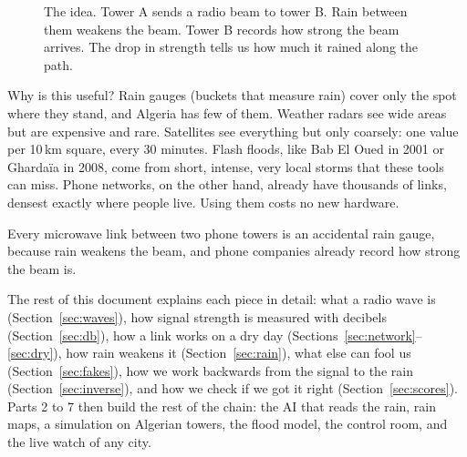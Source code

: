 \documentclass[11pt,a4paper]{article}
\begin{document}
\begin{figure}[h]
\centering
{}
\caption{The idea. Tower A sends a radio beam to tower B. Rain between them weakens the beam.
Tower B records how strong the beam arrives. The drop in strength tells us how much it rained
along the path.}
\label{fig:idea}
\end{figure}

Why is this useful? Rain gauges (buckets that measure rain) cover only the spot where they stand,
and Algeria has few of them. Weather radars see wide areas but are expensive and rare. Satellites
see everything but only coarsely: one value per 10\,km square, every 30 minutes. Flash floods,
like Bab El Oued in 2001 or Ghardaïa in 2008, come from short, intense, very local storms that
these tools can miss. Phone networks, on the other hand, already have thousands of links,
densest exactly where people live. Using them costs no new hardware.

\begin{oneline}
Every microwave link between two phone towers is an accidental rain gauge, because rain weakens
the beam, and phone companies already record how strong the beam is.
\end{oneline}

The rest of this document explains each piece in detail: what a radio wave is
(Section~\ref{sec:waves}), how signal strength is measured with decibels (Section~\ref{sec:db}),
how a link works on a dry day (Sections~\ref{sec:network}--\ref{sec:dry}), how rain weakens it
(Section~\ref{sec:rain}), what else can fool us (Section~\ref{sec:fakes}), how we work backwards
from the signal to the rain (Section~\ref{sec:inverse}), and how we check if we got it right
(Section~\ref{sec:scores}). Parts 2 to 7 then build the rest of the chain: the AI that reads the rain, rain maps, a
simulation on Algerian towers, the flood model, the control room, and the live watch of any city.
\end{document}
